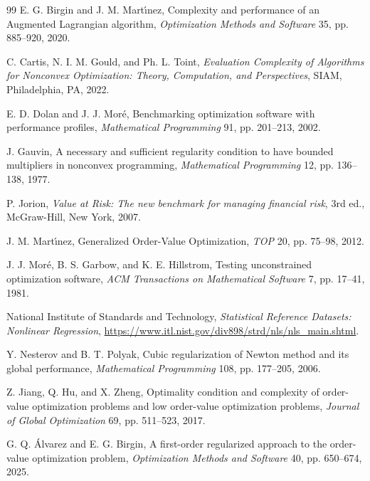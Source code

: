 \documentclass[11pt]{article}
\newcounter{alg}[section]
\begin{document}
\begin{thebibliography}{99}
 E. G. Birgin and J. M. Mart\'{\i}nez, Complexity and performance of an Augmented Lagrangian algorithm, \textit{Optimization Methods and Software} 35, pp. 885--920, 2020.

 C. Cartis, N. I. M. Gould, and Ph. L. Toint, \textit{Evaluation Complexity of Algorithms for Nonconvex Optimization: Theory, Computation, and Perspectives}, SIAM, Philadelphia, PA, 2022.

 E. D. Dolan and J. J. Mor\'e, Benchmarking optimization software with performance profiles, \textit{Mathematical Programming} 91, pp. 201--213, 2002.

 J. Gauvin, A necessary and sufficient regularity condition to have bounded multipliers in nonconvex programming, \textit{Mathematical Programming} 12, pp. 136--138, 1977.

 P. Jorion, \textit{Value at {R}isk: {T}he new benchmark for managing financial risk}, 3rd ed., McGraw-Hill, New York, 2007.

 J. M. Mart\'{\i}nez, Generalized Order-Value Optimization, \textit{TOP} 20, pp. 75--98, 2012.

 J. J. Mor\'e, B. S. Garbow, and K. E. Hillstrom, Testing unconstrained optimization software, \textit{ACM Transactions on Mathematical Software} 7, pp. 17--41, 1981.

 National Institute of Standards and Technology, \textit{Statistical Reference Datasets: Nonlinear Regression}, \url{https://www.itl.nist.gov/div898/strd/nls/nls_main.shtml}.

 Y. Nesterov and B. T. Polyak, Cubic regularization of Newton method and its global performance, \textit{Mathematical Programming} 108, pp. 177--205, 2006.

 Z. Jiang, Q. Hu, and X. Zheng, Optimality condition and complexity of order-value optimization problems and low order-value optimization problems, \textit{Journal of Global Optimization} 69, pp. 511--523, 2017.

 G. Q. Álvarez and E. G. Birgin, A first-order regularized approach to the order-value optimization problem, \textit{Optimization Methods and Software} 40, pp. 650--674, 2025.
    
\end{thebibliography}
\end{document}
